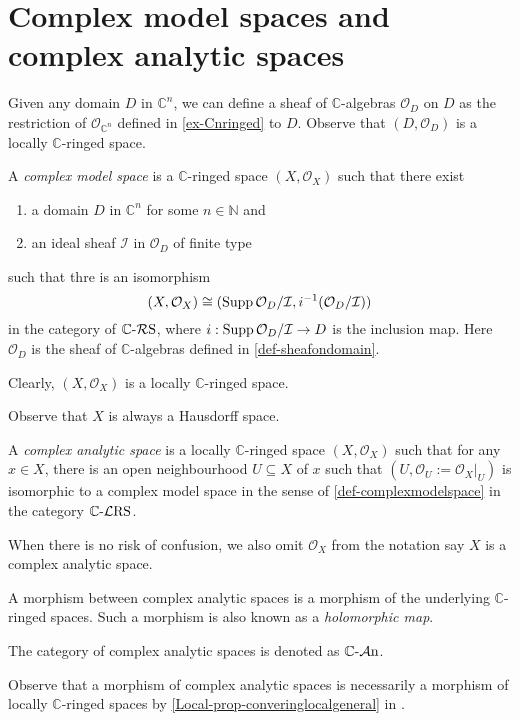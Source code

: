 \section{Complex model spaces and complex analytic spaces}



\begin{definition}\label{def-sheafondomain}
Given any domain $D$ in $\mathbb{C}^n$, we can define a sheaf of $\mathbb{C}$-algebras $\mathcal{O}_D$ on $D$ as the restriction of $\mathcal{O}_{\mathbb{C}^n}$ defined in \cref{ex-Cnringed} to $D$. Observe that $(D,\mathcal{O}_D)$ is a locally $\mathbb{C}$-ringed space. 
\end{definition}


\begin{definition}\label{def-complexmodelspace}
    A \emph{complex model space} is a $\mathbb{C}$-ringed space $(X,\mathcal{O}_X)$ such that there exist
    \begin{enumerate}
        \item a domain $D$ in $\mathbb{C}^n$ for some $n\in \mathbb{N}$ and
        \item an ideal sheaf $\mathcal{I}$ in $\mathcal{O}_D$ of finite type
    \end{enumerate}
    such that thre is an isomorphism
    \[
        (X,\mathcal{O}_X)\cong (\operatorname{Supp} \mathcal{O}_D/\mathcal{I},i^{-1}(\mathcal{O}_D/\mathcal{I}))
    \]
    in the category of $\mathbb{C}\text{-}\mathcal{R}\mathrm{S}$, where $i:\operatorname{Supp} \mathcal{O}_D/\mathcal{I}\rightarrow D$ is the inclusion map. Here $\mathcal{O}_D$ is the sheaf of $\mathbb{C}$-algebras defined in \cref{def-sheafondomain}.

    Clearly, $(X,\mathcal{O}_X)$ is a locally $\mathbb{C}$-ringed space.
\end{definition}
Observe that $X$ is always a Hausdorff space.

\begin{definition}\label{def-complexanalyticspace}
    A \emph{complex analytic space} is a locally $\mathbb{C}$-ringed space $(X,\mathcal{O}_X)$ such that 
    for any $x\in X$, there is an open neighbourhood $U\subseteq X$ of $x$ such that $(U,\mathcal{O}_U:=\mathcal{O}_X|_U)$ is isomorphic to a complex model space in the sense of \cref{def-complexmodelspace} in the category $\mathbb{C}\text{-}\mathcal{L}\mathrm{RS}$.
    
    When there is no risk of confusion, we also omit $\mathcal{O}_X$ from the notation say $X$ is a complex analytic space.

    A morphism between complex analytic spaces is a morphism of the underlying  $\mathbb{C}$-ringed spaces. Such a morphism is also known as a \emph{holomorphic map}.

    The category of complex analytic spaces is denoted as $\mathbb{C}\text{-}\mathcal{A}\mathrm{n}$.
\end{definition}
Observe that a morphism of complex analytic spaces is necessarily a morphism of locally $\mathbb{C}$-ringed spaces by \cref{Local-prop-converinglocalgeneral} in .

